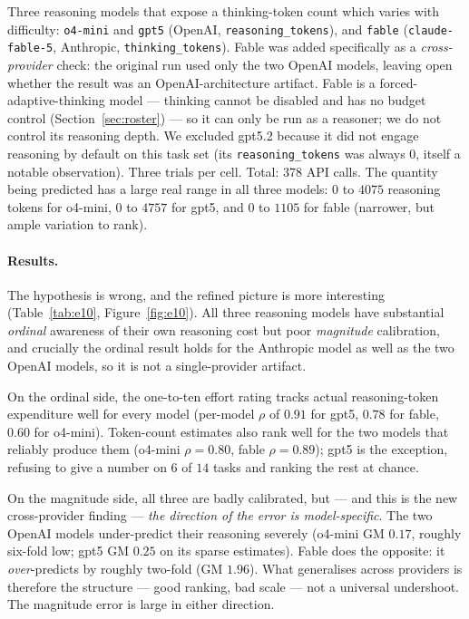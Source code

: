 \documentclass[11pt]{article}
\newcommand{\code}[1]{\texttt{\small #1}}
\begin{document}
Three reasoning models that expose a thinking-token count which varies with difficulty:
\code{o4-mini} and \code{gpt5} (OpenAI, \code{reasoning\_tokens}), and \code{fable}
(\code{claude-fable-5}, Anthropic, \code{thinking\_tokens}). Fable was added specifically as a
\emph{cross-provider} check: the original run used only the two OpenAI models, leaving open
whether the result was an OpenAI-architecture artifact. Fable is a forced-adaptive-thinking
model --- thinking cannot be disabled and has no budget control (Section~\ref{sec:roster}) ---
so it can only be run as a reasoner; we do not control its reasoning depth. We excluded gpt5.2
because it did not engage reasoning by default on this task set (its \code{reasoning\_tokens}
was always $0$, itself a notable observation). Three trials per cell. Total: 378 API calls. The
quantity being predicted has a large real range in all three models: 0 to $4075$ reasoning
tokens for o4-mini, 0 to $4757$ for gpt5, and 0 to $1105$ for fable (narrower, but ample
variation to rank).

\paragraph{Results.} The hypothesis is wrong, and the refined picture is more interesting
(Table~\ref{tab:e10}, Figure~\ref{fig:e10}). All three reasoning models have substantial
\emph{ordinal} awareness of their own reasoning cost but poor \emph{magnitude} calibration, and
crucially the ordinal result holds for the Anthropic model as well as the two OpenAI models, so
it is not a single-provider artifact.

On the ordinal side, the one-to-ten effort rating tracks actual reasoning-token expenditure
well for every model (per-model $\rho$ of $0.91$ for gpt5, $0.78$ for fable, $0.60$ for
o4-mini). Token-count estimates also rank well for the two models that reliably produce them
(o4-mini $\rho = 0.80$, fable $\rho = 0.89$); gpt5 is the exception, refusing to give a number
on $6$ of $14$ tasks and ranking the rest at chance.

On the magnitude side, all three are badly calibrated, but --- and this is the new
cross-provider finding --- \emph{the direction of the error is model-specific}. The two OpenAI
models under-predict their reasoning severely (o4-mini GM $0.17$, roughly six-fold low; gpt5
GM $0.25$ on its sparse estimates). Fable does the opposite: it \emph{over}-predicts by roughly
two-fold (GM $1.96$). What generalises across providers is therefore the structure --- good
ranking, bad scale --- not a universal undershoot. The magnitude error is large in either
direction.
\end{document}
